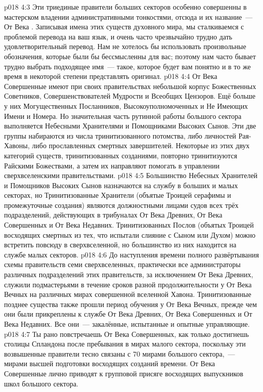 \vs p018 4:3 \pc Эти триединые правители больших секторов особенно совершенны в мастерском владении административными тонкостями, отсюда и их название~--- От Века . Записывая имена этих существ духовного мира, мы сталкиваемся с проблемой перевода на ваш язык, и очень часто чрезвычайно трудно дать удовлетворительный перевод. Нам не хотелось бы использовать произвольные обозначения, которые были бы бессмысленны для вас; поэтому нам часто бывает трудно выбрать подходящее имя~--- такое, которое будет вам понятно и в то же время в некоторой степени представлять оригинал.
\vs p018 4:4 \pc От Века Совершенные имеют при своих правительствах небольшой корпус Божественных Советников, Совершенствователей Мудрости и Всеобщих Цензоров. Ещё больше у них Могущественных Посланников, Высокоуполномоченных и Не Имеющих Имени и Номера. Но значительная часть рутинной работы большого сектора выполняется Небесными Хранителями и Помощниками Высоких Сынов. Эти две группы набираются из числа тринитизованного потомства, либо личностей Рая\hyp{}Хавоны, либо прославленных смертных завершителей. Некоторые из этих двух категорий существ, тринитизованных созданиями, повторно тринитизуются Райскими Божествами, а затем их направляют помогать в управлении сверхвселенскими правительствами.
\vs p018 4:5 Большинство Небесных Хранителей и Помощников Высоких Сынов назначаются на службу в больших и малых секторах, но Тринитизованные Хранители (объятые Троицей серафимы и промежуточные создания) являются должностными лицами судов всех трёх подразделений, действующих в трибуналах От Века Древних, От Века Совершенных и От Века Недавних. Тринитизованных Послов (объятых Троицей восходящих смертных из тех, что испытали слияние с Сыном или Духом) можно встретить повсюду в сверхвселенной, но большинство из них находится на службе малых секторов.
\vs p018 4:6 До наступления времени полного развёртывания схемы правительств семи сверхвселенных, практически все администраторы различных подразделений этих правительств, за исключением От Века Древних, служили подмастерьями в течение сроков разной продолжительности у От Века Вечных на различных мирах совершенной вселенной Хавона. Тринитизованные позднее существа также прошли период обучения у От Века Вечных, прежде чем они были прикреплены к службе От Века Древних, От Века Совершенных и От Века Недавних. Все они~--- закалённые, испытанные и опытные управляющие.
\vs p018 4:7 \pc Ты рано повстречаешь От Века Совершенных, как только достигнешь столицы Спландона после пребывания в мирах малого сектора, поскольку эти возвышенные правители тесно связаны с 70 мирами большого сектора,~--- мирами высшей подготовки восходящих созданий времени. От Века Совершенные лично приводят к групповой присяге восходящих выпускников школ большого сектора.
